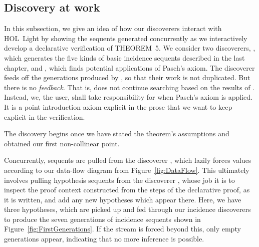 \subsection{Discovery at work}\label{sec:DiscoveryAtWork}
In this subsection, we give an idea of how our discoverers interact with HOL~Light by showing the sequents generated concurrently as we interactively develop a declarative verification of THEOREM~5. We consider two discoverers, , which generates the five kinds of basic incidence sequents described in the last chapter, and , which finds potential applications of Pasch's axiom. The  discoverer feeds off the generations produced by , so that their work is not duplicated. But there is no \emph{feedback}. That is,  does not continue searching based on the results of . Instead, we, the user, shall take responsibility for when Pasch's axiom is applied. It is a point introduction axiom explicit in the prose that we want to keep explicit in the verification.

The discovery begins once we have stated the theorem's assumptions and obtained our first non-collinear point.

\linebreak

Concurrently, sequents are pulled from the discoverer , which lazily forces values according to our data-flow diagram from Figure~\ref{fig:DataFlow}. This ultimately involves pulling hypothesis sequents from the discoverer , whose job it is to inspect the proof context constructed from the steps of the declarative proof, as it is written, and add any new hypotheses which appear there. Here, we have three hypotheses, which are picked up and fed through our incidence discoverers to produce the seven generations of incidence sequents shown in Figure~\ref{fig:FirstGenerations}. If the stream is forced beyond this, only empty generations appear, indicating that no more inference is possible.

